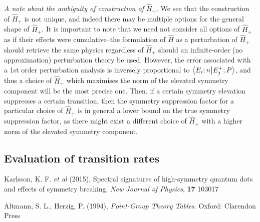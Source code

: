 \documentclass[12pt]{article}
\begin{document}
	\textit{A note about the ambiguity of construction of $\hat{H}_+$}. We see that the construction of $\hat{H}_+$ is not unique, and indeed there may be multiple options for the general shape of $\hat{H}_+$. It is important to note that we need not consider all options of $\hat{H}_+$ as if their effects were cumulative--the formulation of $\hat{H}$ as a perturbation of $\hat{H}_+$ should retrieve the same physics regardless of $\hat{H}_+$ should an infinite-order (no approximation) perturbation theory be used. However, the error associated with a 1st order perturbation analysis is inversely proportional to $\braket{E_i;n}{E_j^+;P}$, and thus a choice of $\hat{H}_+$ which maximises the norm of the elevated symmetry component will be the most precise one. Then, if a certain symmetry elevation suppresses a certain transition, then the symmetry suppression factor for a particular choice of $\hat{H}_+$ is in general a lower bound on the true symmetry suppression factor, as there might exist a different choice of $\hat{H}_+$ with a higher norm of the elevated symmetry component.
	
	\subsection{Evaluation of transition rates}
	
	
	
	\begin{thebibliography}{10}

Karlsson, K. F. \textit{et al} (2015), Spectral signatures of high-symmetry quantum dots and effects of symmetry breaking. \textit{New Journal of Physics}, \textbf{17} 103017

Altmann, S. L., Herzig, P. (1994), \textit{Point-Group Theory Tables}. Oxford: Clarendon Press


\end{thebibliography}	
	
\end{document}
